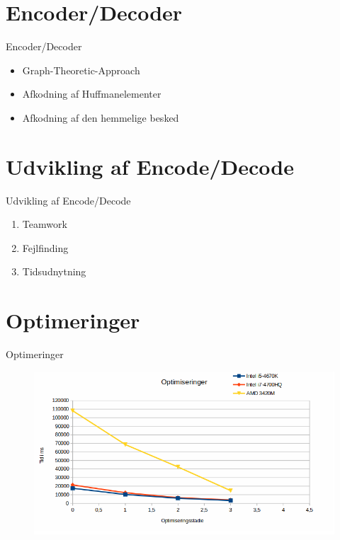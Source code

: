 \section{Encoder/Decoder}
\begin{frame}{Encoder/Decoder}{}
	\begin{itemize}
		\item Graph-Theoretic-Approach
		\item Afkodning af Huffmanelementer
		\item Afkodning af den hemmelige besked
	\end{itemize}
\end{frame}


\section{Udvikling af Encode/Decode}
\begin{frame}{Udvikling af Encode/Decode}{}
	\begin{enumerate}
		\item Teamwork
		\item Fejlfinding
		\item Tidsudnytning
	\end{enumerate}
\end{frame}


\section{Optimeringer}
\begin{frame}{Optimeringer}{}
		\begin{figure}[!H]
			\centering
			\includegraphics[width=1\textwidth]{./Jacob/Selection_744.png}
	\end{figure}
\end{frame}